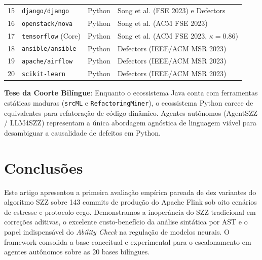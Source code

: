 \documentclass[10pt,journal,compsoc]{IEEEtran}
\begin{document}
\begin{table}[h]
\begin{tabularx}{\columnwidth}{llcX}
\midrule
15 & \texttt{django/django} & Python & Song et al. (FSE 2023) \cite{song2023practical} e Defectors \cite{mahbub2023defectors} \\
16 & \texttt{openstack/nova} & Python & Song et al. (ACM FSE 2023) \cite{song2023practical} \\
17 & \texttt{tensorflow} (Core) & Python & Song et al. (ACM FSE 2023, $\kappa=0.86$) \cite{song2023practical} \\
18 & \texttt{ansible/ansible} & Python & Defectors (IEEE/ACM MSR 2023) \cite{mahbub2023defectors} \\
19 & \texttt{apache/airflow} & Python & Defectors (IEEE/ACM MSR 2023) \cite{mahbub2023defectors} \\
20 & \texttt{scikit-learn} & Python & Defectors (IEEE/ACM MSR 2023) \cite{mahbub2023defectors} \\
\bottomrule
\end{tabularx}
\end{table}

\textbf{Tese da Coorte Bilíngue}: Enquanto o ecossistema Java conta com ferramentas estáticas maduras (\texttt{srcML} e \texttt{RefactoringMiner}), o ecossistema Python carece de equivalentes para refatoração de código dinâmico. Agentes autônomos (AgentSZZ / LLM4SZZ) representam a única abordagem agnóstica de linguagem viável para desambiguar a causalidade de defeitos em Python.

\section{Conclusões}
Este artigo apresentou a primeira avaliação empírica pareada de dez variantes do algoritmo SZZ sobre 143 commits de produção do Apache Flink sob oito cenários de estresse e protocolo cego. Demonstramos a inoperância do SZZ tradicional em correções aditivas, o excelente custo-benefício da análise sintática por AST e o papel indispensável do \textit{Ability Check} na regulação de modelos neurais. O framework consolida a base conceitual e experimental para o escalonamento em agentes autônomos sobre as 20 bases bilíngues.



\end{document}
